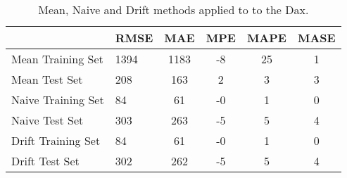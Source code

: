 \begin{table}[ht]
\centering
\caption[Simple forecasting methods.]{Mean, Naive and Drift methods applied to 
         to the Dax.} 
\label{tab:chp_ts:sma}
\begin{tabular}{llcccc}
  \toprule  & RMSE & MAE & MPE & MAPE & MASE \\ 
  \midrule Mean Training Set & 1394 & 1183 & -8 & 25 & 1 \\ 
  Mean Test Set & 208 & 163 & 2 & 3 & 3 \\ 
  Naive Training Set & 84 & 61 & -0 & 1 & 0 \\ 
  Naive Test Set & 303 & 263 & -5 & 5 & 4 \\ 
  Drift Training Set & 84 & 61 & -0 & 1 & 0 \\ 
  Drift Test Set & 302 & 262 & -5 & 5 & 4 \\ 
   \bottomrule \end{tabular}
\end{table}
